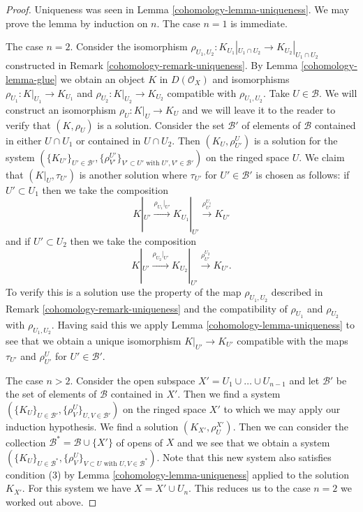 \begin{proof}

Uniqueness was seen in Lemma \ref{cohomology-lemma-uniqueness}. We may prove the lemma
by induction on $n$. The case $n = 1$ is immediate.

\medskip\noindent
The case $n = 2$.
Consider the isomorphism
$\rho_{U_1, U_2} : K_{U_1}|_{U_1 \cap U_2} \to K_{U_2}|_{U_1 \cap U_2}$
constructed in Remark \ref{cohomology-remark-uniqueness}.
By Lemma \ref{cohomology-lemma-glue} we obtain an object $K$ in $D(\mathcal{O}_X)$
and isomorphisms $\rho_{U_1} : K|_{U_1} \to K_{U_1}$ and
$\rho_{U_2} : K|_{U_2} \to K_{U_2}$ compatible with $\rho_{U_1, U_2}$.
Take $U \in \mathcal{B}$. We will construct an isomorphism
$\rho_U : K|_U \to K_U$ and we will leave it to the reader to verify
that $(K, \rho_U)$ is a solution. Consider the set $\mathcal{B}'$
of elements of $\mathcal{B}$ contained in either $U \cap U_1$ or contained in
$U \cap U_2$. Then $(K_U, \rho^U_{U'})$ is a solution for the system
$(\{K_{U'}\}_{U' \in \mathcal{B}'},
\{\rho_{V'}^{U'}\}_{V' \subset U'\text{ with }U', V' \in \mathcal{B}'})$
on the ringed space $U$.
We claim that $(K|_U, \tau_{U'})$ is another solution where
$\tau_{U'}$ for $U' \in \mathcal{B}'$ is chosen as follows:
if $U' \subset U_1$ then we take the composition
$$
K|_{U'} \xrightarrow{\rho_{U_1}|_{U'}}
K_{U_1}|_{U'} \xrightarrow{\rho^{U_1}_{U'}}
K_{U'}
$$
and if $U' \subset U_2$ then we take the composition
$$
K|_{U'} \xrightarrow{\rho_{U_2}|_{U'}}
K_{U_2}|_{U'} \xrightarrow{\rho^{U_2}_{U'}}
K_{U'}.
$$
To verify this is a solution use the property of the map $\rho_{U_1, U_2}$
described in Remark \ref{cohomology-remark-uniqueness} and the compatibility of
$\rho_{U_1}$ and $\rho_{U_2}$ with $\rho_{U_1, U_2}$. Having said this
we apply Lemma \ref{cohomology-lemma-uniqueness} to see that we obtain a unique
isomorphism $K|_{U'} \to K_{U'}$ compatible with the maps $\tau_{U'}$ and
$\rho^U_{U'}$ for $U' \in \mathcal{B}'$.

\medskip\noindent
The case $n > 2$. Consider the open subspace
$X' = U_1 \cup \ldots \cup U_{n - 1}$ and let $\mathcal{B}'$ be the set of
elements of $\mathcal{B}$ contained in $X'$. Then we find a system
$(\{K_U\}_{U \in \mathcal{B}'}, \{\rho_V^U\}_{U, V \in \mathcal{B}'})$
on the ringed space $X'$ to which we may apply our induction hypothesis.
We find a solution $(K_{X'}, \rho^{X'}_U)$.
Then we can consider the collection
$\mathcal{B}^* = \mathcal{B} \cup \{X'\}$ of opens of $X$ and we see that
we obtain a system
$(\{K_U\}_{U \in \mathcal{B}^*},
\{\rho_V^U\}_{V \subset U\text{ with }U, V \in \mathcal{B}^*})$.
Note that this new system also satisfies condition (3)
by Lemma \ref{cohomology-lemma-uniqueness} applied to the solution $K_{X'}$.
For this system we have $X = X' \cup U_n$.
This reduces us to the case $n = 2$ we worked out above.
\end{proof}

